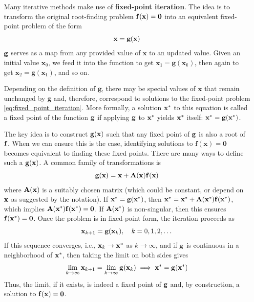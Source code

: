 Many iterative methods make use of  \textbf{fixed-point iteration}. The idea is to transform the original root-finding problem $\mathbf{f}(\mathbf{x}) = \mathbf{0}$ into an equivalent fixed-point problem of the form
\begin{equation}
    \mathbf{x} = \mathbf{g}(\mathbf{x})
    \label{eq:fixed_point_iteration}
\end{equation}
$\mathbf{g}$ serves as a map from any provided value of $\mathbf x$ to an updated value. Given an initial value $\mathbf x_0$, we feed it into the function to get $\mathbf x_1 = \mathbf g(\mathbf x_0)$, then again to get $\mathbf x_2 = \mathbf g(\mathbf x_1)$, and so on.

Depending on the definition of $\mathbf g$, there may be special values of $\mathbf x$ that remain unchanged by $\mathbf g$ and, therefore, correspond to solutions to the fixed-point problem \autoref{eq:fixed_point_iteration}. More formally, a solution $\mathbf{x}^*$ to this equation is called a fixed point of the function $\mathbf{g}$ if applying $\mathbf{g}$ to $\mathbf{x}^*$ yields $\mathbf{x}^*$ itself: $\mathbf{x}^* = \mathbf{g}(\mathbf{x}^*)$. 

The key idea is to construct $\mathbf{g}(\mathbf{x})$ such that any fixed point of $\mathbf{g}$ is also a root of $\mathbf{f}$. When we can ensure this is the case, identifying solutions to $\mathbf f(\mathbf x) = \mathbf 0$ becomes equivalent to finding these fixed points. There are many ways to define such a $\mathbf{g}(\mathbf{x})$. A common family of transformations is
\begin{equation}
    \mathbf{g}(\mathbf{x}) = \mathbf{x} + \mathbf{A}(\mathbf{x})\mathbf{f}(\mathbf{x})
\end{equation}
where $\mathbf{A}(\mathbf{x})$ is a suitably chosen matrix (which could be constant, or depend on $\mathbf{x}$ as suggested by the notation). If $\mathbf{x}^* = \mathbf{g}(\mathbf{x}^*)$, then $\mathbf{x}^* = \mathbf{x}^* + \mathbf{A}(\mathbf{x}^*)\mathbf{f}(\mathbf{x}^*)$, which implies $\mathbf{A}(\mathbf{x}^*)\mathbf{f}(\mathbf{x}^*) = \mathbf{0}$. If $\mathbf{A}(\mathbf{x}^*)$ is non-singular, then this ensures $\mathbf{f}(\mathbf{x}^*) = \mathbf{0}$. Once the problem is in fixed-point form, the iteration proceeds as
\begin{equation}
    \mathbf{x}_{k+1} = \mathbf{g}(\mathbf{x}_k), \quad k = 0, 1, 2, \dots
\end{equation}
If this sequence converges, i.e., $\mathbf{x}_k \to \mathbf{x}^*$ as $k \to \infty$, and if $\mathbf{g}$ is continuous in a neighborhood of $\mathbf{x}^*$, then taking the limit on both sides gives
\begin{equation} 
\lim_{k\to\infty} \mathbf{x}_{k+1} = \lim_{k\to\infty} \mathbf{g}(\mathbf{x}_k) \implies \mathbf{x}^* = \mathbf{g}(\mathbf{x}^*) 
\end{equation}
Thus, the limit, if it exists, is indeed a fixed point of $\mathbf{g}$ and, by construction, a solution to $\mathbf{f}(\mathbf{x}) = \mathbf{0}$.

